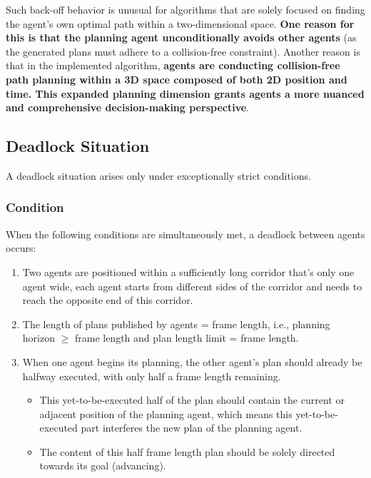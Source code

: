 Such back-off behavior is unusual for algorithms that are solely focused on finding the agent's own optimal path within a two-dimensional space.
\textbf{One reason for this is that the planning agent unconditionally avoids other agents} (as the generated plans must adhere to a collision-free constraint). 
Another reason is that in the implemented algorithm, \textbf{agents are conducting collision-free path planning within a 3D space composed of both 2D position and time. This expanded planning dimension grants agents a more nuanced and comprehensive decision-making perspective}.

\subsection{Deadlock Situation}

A deadlock situation arises only under exceptionally strict conditions.

\subsubsection{Condition}
When the following conditions are simultaneously met, a deadlock between agents occurs:

\begin{enumerate}
    \item Two agents are positioned within a sufficiently long corridor that's only one agent wide, each agent starts from different sides of the corridor and needs to reach the opposite end of this corridor.
    \item The length of plans published by agents = frame length, i.e., planning horizon $\geq$ frame length and plan length limit = frame length.
    \item When one agent begins its planning, the other agent's plan should already be halfway executed, 
    with only half a frame length remaining. 
    \begin{itemize}
        \item This yet-to-be-executed half of the plan should contain the current or adjacent position of the planning agent, which means this yet-to-be-executed part interferes the new plan of the planning agent. 
        \item The content of this half frame length plan should be solely directed towards its goal (advancing).
    \end{itemize}
\end{enumerate}
